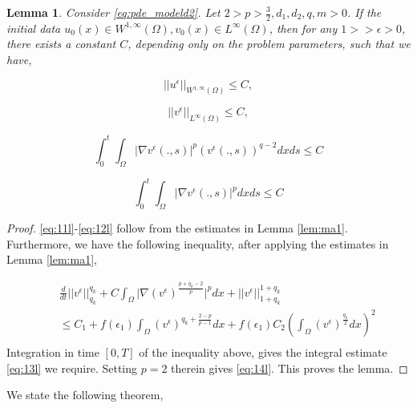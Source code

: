 \documentclass[10pt]{amsart}
\theoremstyle{plain}
\newtheorem{lemma}[theorem]{Lemma}
\theoremstyle{definition}
\begin{document}
\begin{lemma}
\label{lem:ge11n}
    Consider \eqref{eq:pde_modeld2}. Let $2>p>\frac{3}{2}, d_{1}, d_{2}, q,m>0$. If the initial data $u_{0}(x) \in W^{1,\infty}(\Omega), v_{0}(x) \in L^{\infty}(\Omega)$, then for any $1>>\epsilon > 0$, there exists a constant $C$, depending only on the problem parameters, such that we have,

\begin{equation}
\label{eq:11l}
    ||u^{\epsilon}||_{W^{1,\infty}(\Omega)} \leq C,
\end{equation}

\begin{equation}
\label{eq:12l}
    ||v^{\epsilon}||_{L^{\infty}(\Omega)} \leq C,
\end{equation}


\begin{equation}
\label{eq:13l}
\int^{t}_{0}\int_{\Omega} 
|\nabla v^{\epsilon}(.,s)|^{p}(v^{\epsilon}(.,s))^{q-2} dx ds \leq C
\end{equation}

\begin{equation}
\label{eq:14l}
\int^{t}_{0}\int_{\Omega} 
|\nabla v^{\epsilon}(.,s)|^{p} dx ds \leq C
\end{equation}
\end{lemma}
\begin{proof}
    \eqref{eq:11l}-\eqref{eq:12l} follow from the estimates in Lemma \ref{lem:ma1}. Furthermore, we have the following inequality, after applying the estimates in Lemma \ref{lem:ma1},
    
    
    \begin{eqnarray}
   && \frac{d}{dt}||v^{\epsilon}||^{q_{k}}_{q_{k}}  
 + C\int_{\Omega} 
\lvert \nabla \left(v^{\epsilon}\right)^{\frac{p + q_{k} - 2}{p}} \rvert ^{p}dx +||v^{\epsilon}||^{1+q_{k}}_{1+q_{k}} \nonumber \\
&& \leq 
    C_{1} +  f(\epsilon_{1})\int_{\Omega} (v^{\epsilon})^{q_{k}+\frac{2-p}{p-1}}dx +  f(\epsilon_{1})C_{2} \left( \int_{\Omega} (v^{\epsilon})^{\frac{q_{k}}{2}}dx\right)^{2} \nonumber \\
    \end{eqnarray}
    Integration in time $[0,T]$ of the inequality above, gives the integral estimate \eqref{eq:13l} we require. Setting $p=2$ therein gives \eqref{eq:14l}. This proves the lemma.
\end{proof}
We state the following theorem,
\end{document}
